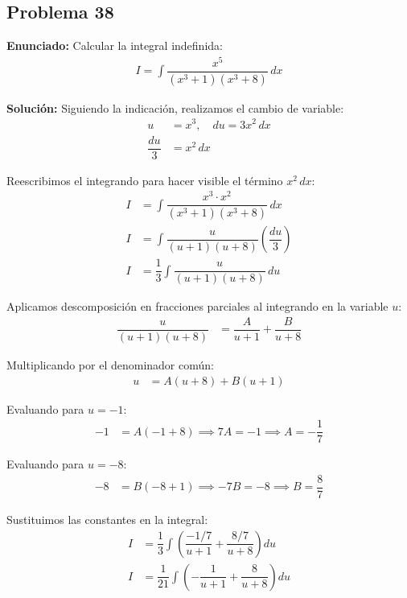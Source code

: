 \subsection*{Problema 38}

\textbf{Enunciado:} 
Calcular la integral indefinida:
\begin{align*}
I = \int \dfrac{x^5}{(x^3 + 1)(x^3 + 8)} \, dx
\end{align*}

\textbf{Solución:}
Siguiendo la indicación, realizamos el cambio de variable:
\begin{align*}
u &= x^3, \quad du = 3x^2 \, dx \\
\dfrac{du}{3} &= x^2 \, dx
\end{align*}

Reescribimos el integrando para hacer visible el término $x^2 \, dx$:
\begin{align*}
I &= \int \dfrac{x^3 \cdot x^2}{(x^3 + 1)(x^3 + 8)} \, dx \\
I &= \int \dfrac{u}{(u + 1)(u + 8)} \left(\dfrac{du}{3}\right) \\
I &= \dfrac{1}{3} \int \dfrac{u}{(u + 1)(u + 8)} \, du
\end{align*}

Aplicamos descomposición en fracciones parciales al integrando en la variable $u$:
\begin{align*}
\dfrac{u}{(u + 1)(u + 8)} &= \dfrac{A}{u + 1} + \dfrac{B}{u + 8}
\end{align*}

Multiplicando por el denominador común:
\begin{align*}
u &= A(u + 8) + B(u + 1)
\end{align*}

Evaluando para $u = -1$:
\begin{align*}
-1 &= A(-1 + 8) \implies 7A = -1 \implies A = -\dfrac{1}{7}
\end{align*}

Evaluando para $u = -8$:
\begin{align*}
-8 &= B(-8 + 1) \implies -7B = -8 \implies B = \dfrac{8}{7}
\end{align*}

Sustituimos las constantes en la integral:
\begin{align*}
I &= \dfrac{1}{3} \int \left( \dfrac{-1/7}{u + 1} + \dfrac{8/7}{u + 8} \right) du \\
I &= \dfrac{1}{21} \int \left( -\dfrac{1}{u + 1} + \dfrac{8}{u + 8} \right) du
\end{align*}

